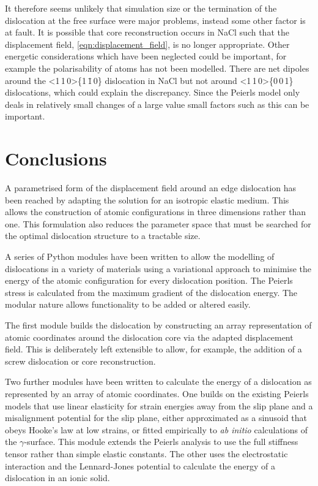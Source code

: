 It therefore seems unlikely that simulation size or the termination of the dislocation at the free surface were major problems, instead some other factor is at fault. It is possible that core reconstruction occurs in NaCl such that the displacement field, \autoref{eqn:displacement_field}, is no longer appropriate. Other energetic considerations which have been neglected could be important, for example the polarisability of atoms has not been modelled. There are net dipoles around the <1\,1\,0>\{1\,\={1}\,0\} dislocation in NaCl but not around <1\,1\,0>\{0\,0\,1\} dislocations, which could explain the discrepancy. Since the Peierls model only deals in relatively small changes of a large value small factors such as this can be important.


\section{Conclusions}

A parametrised form of the displacement field around an edge dislocation has been reached by adapting the solution for an isotropic elastic medium. This allows the construction of atomic configurations in three dimensions rather than one. This formulation also reduces the parameter space that must be searched for the optimal dislocation structure to a tractable size.

A series of Python modules have been written to allow the modelling of dislocations in a variety of materials using a variational approach to minimise the energy of the atomic configuration for every dislocation position. The Peierls stress is calculated from the maximum gradient of the dislocation energy. The modular nature allows functionality to be added or altered easily. 

The first module builds the dislocation by constructing an array representation of atomic coordinates around the dislocation core via the adapted displacement field. This is deliberately left extensible to allow, for example, the addition of a screw dislocation or core reconstruction.

Two further modules have been written to calculate the energy of a dislocation as represented by an array of atomic coordinates. One builds on the existing Peierls models that use linear elasticity for strain energies away from the slip plane and a misalignment potential for the slip plane, either approximated as a sinusoid that obeys Hooke's law at low strains, or fitted empirically to \emph{ab initio} calculations of the $\gamma$-surface. This module extends the Peierls analysis to use the full stiffness tensor rather than simple elastic constants. The other uses the electrostatic interaction and the Lennard-Jones potential to calculate the energy of a dislocation in an ionic solid.

